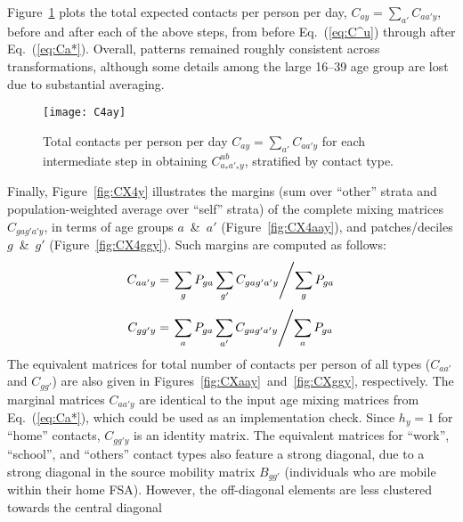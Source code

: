\par
Figure~\ref{fig:C4Ay} plots the total expected contacts per person per day,
$C_{ay} = \sum_{a'} C_{aa'y}$, before and after each of the above steps,
from before Eq.~(\ref{eq:C^u}) through after Eq.~(\ref{eq:Ca*}).
Overall, patterns remained roughly consistent across transformations,
although some details among the large 16--39 age group are lost due to substantial averaging.%
\begin{figure}
  \centering
  \texttt{[image: C4ay]}
  \caption{Total contacts per person per day $C_{ay} = \sum_{a'} C_{aa'y}$
    for each intermediate step in obtaining $C^{ub}_{a_*a'_*y}$,
    stratified by contact type.}
  \label{fig:C4Ay}
\end{figure}
\par
Finally, Figure~\ref{fig:CX4y} illustrates the margins
(sum over ``other'' strata and population-weighted average over ``self'' strata)
of the complete mixing matrices $C_{gag'a'y}$, in terms of
age groups $a$~\&~$a'$ (Figure~\ref{fig:CX4aay}), and
patches/deciles $g$~\&~$g'$ (Figure~\ref{fig:CX4ggy}).
Such margins are computed as follows:
\begin{equation}\label{eq:Caay}
  C_{aa'y} = \left.\sum_{g} P_{ga} \sum_{g'} C_{gag'a'y} \middle/ \sum_{g} P_{ga} \right.
\end{equation}
\begin{equation}\label{eq:Cggy}
  C_{gg'y} = \left.\sum_{a} P_{ga} \sum_{a'} C_{gag'a'y} \middle/ \sum_{a} P_{ga} \right.
\end{equation}
The equivalent matrices for total number of contacts per person of all types
($C_{aa'}$ and $C_{gg'}$) are also given in Figures~\ref{fig:CXaay}~and~\ref{fig:CXggy}, respectively.
The marginal matrices $C_{aa'y}$ are identical to the input age mixing matrices from Eq.~(\ref{eq:Ca*}),
which could be used as an implementation check.
Since $h_y = 1$ for ``home'' contacts, $C_{gg'y}$ is an identity matrix.
The equivalent matrices for ``work'', ``school'', and ``others'' contact types
also feature a strong diagonal, due to a strong diagonal in the source mobility matrix $B_{gg'}$
(individuals who are mobile within their home FSA).
However, the off-diagonal elements are less clustered towards the central diagonal
